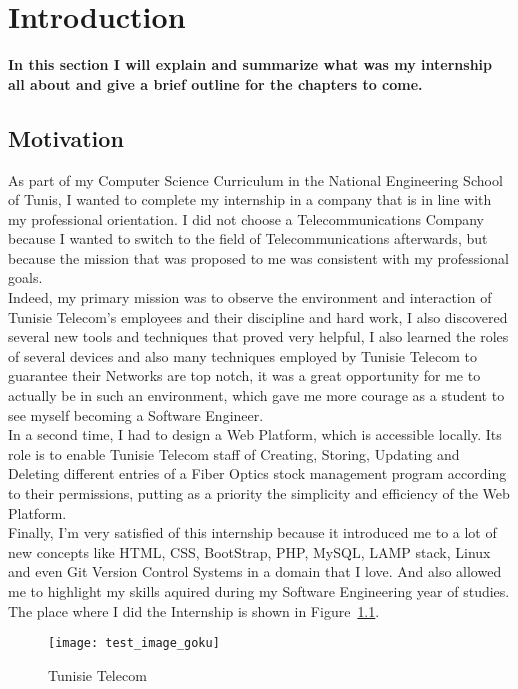 ﻿\chapter{Introduction}
\label{chap:intro}
\textbf{In this section I will explain and summarize what was my internship all about and give a brief outline for the chapters to come.}
\section{Motivation}
	
	As part of my Computer Science Curriculum in the National Engineering School of Tunis, I wanted to complete my internship in a company that is in line with my professional orientation. I did not choose a Telecommunications Company because I wanted to switch to the field of Telecommunications afterwards, but because the mission that was proposed to me was consistent with my professional goals. \\  

	Indeed, my primary mission was to observe the environment and interaction of Tunisie Telecom's employees and their discipline and hard work, I also discovered several new tools and techniques that proved very helpful, I also learned the roles of several devices and also many techniques employed by Tunisie Telecom to guarantee their Networks are top notch, it was a great opportunity for me to actually be in such an environment, which gave me more courage as a student to see myself becoming a Software Engineer. \\
	
	In a second time, I had to design a Web Platform, which is accessible locally. Its role is to enable Tunisie Telecom staff of Creating, Storing, Updating and Deleting different entries of a Fiber Optics stock management program according to their permissions, putting as a priority the simplicity and efficiency of the Web Platform.\\

	Finally,  I'm very satisfied of this internship because it introduced me to a lot of new concepts like HTML, CSS, BootStrap, PHP, MySQL, LAMP stack, Linux and even Git Version Control Systems in a domain that I love. And also allowed me to highlight my skills aquired during my Software Engineering year of studies. \\ 

The place where I did the Internship is shown in Figure~\ref{fig:test1}.
\begin{figure}[ht!]
  \centering
  \texttt{[image: test\_image\_goku]}
  \caption[Where I Did the Internship]{Tunisie Telecom }
  \label{fig:test1}
\end{figure}

